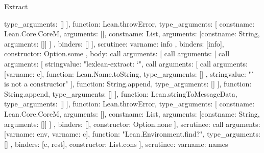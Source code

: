\begin{lexlean}{Extract}
\begin{toolingmodule}
{{{{{{{{{{                              type_arguments: []
                            }
                          ],
                          function: Lean.throwError,
                          type_arguments: [
                            const{name: Lean.Core.CoreM, arguments: []},
                            const{name: List, arguments: [const{name: String, arguments: []}]}
                          ]
                        },
                        binders: []
                      }
                    ],
                    scrutinee: var{name: info}
                  },
                  binders: [info],
                  constructor: Option.some
                },
                {
                  body: call{
                    arguments: [
                      call{
                        arguments: [
                          call{
                            arguments: [
                              string{value: "lexlean-extract: `"},
                              call{
                                arguments: [
                                  call{
                                    arguments: [var{name: c}],
                                    function: Lean.Name.toString,
                                    type_arguments: []
                                  },
                                  string{value: "` is not a constructor"}
                                ],
                                function: String.append,
                                type_arguments: []
                              }
                            ],
                            function: String.append,
                            type_arguments: []
                          }
                        ],
                        function: Lean.stringToMessageData,
                        type_arguments: []
                      }
                    ],
                    function: Lean.throwError,
                    type_arguments: [
                      const{name: Lean.Core.CoreM, arguments: []},
                      const{name: List, arguments: [const{name: String, arguments: []}]}
                    ]
                  },
                  binders: [],
                  constructor: Option.none
                }
              ],
              scrutinee: call{
                arguments: [var{name: env}, var{name: c}],
                function: "Lean.Environment.find?",
                type_arguments: []
              }
            },
            binders: [c, rest],
            constructor: List.cons
          }
        ],
        scrutinee: var{name: names}
}}}
\end{toolingmodule}
\end{lexlean}
